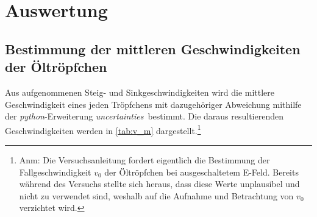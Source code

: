\section{Auswertung}
\label{sec:Auswertung}
\subsection{Bestimmung der mittleren Geschwindigkeiten der Öltröpfchen}
Aus aufgenommenen Steig- und Sinkgeschwindigkeiten wird die mittlere Geschwindigkeit eines jeden Tröpfchens
mit dazugehöriger Abweichung mithilfe der \textit{python}-Erweiterung \textit{uncertainties}\,\cite{uncertainties}
bestimmt. Die daraus resultierenden Geschwindigkeiten werden in \autoref{tab:v_m} dargestellt.\footnote{Anm: Die 
Versuchsanleitung fordert eigentlich die Bestimmung der Fallgeschwindigkeit $v_0$ der Öltröpfchen bei ausgeschaltetem
E-Feld. Bereits während des Versuchs stellte sich heraus, dass diese Werte unplausibel und nicht zu verwendet sind, 
weshalb auf die Aufnahme und Betrachtung von $v_0$ verzichtet wird.}

